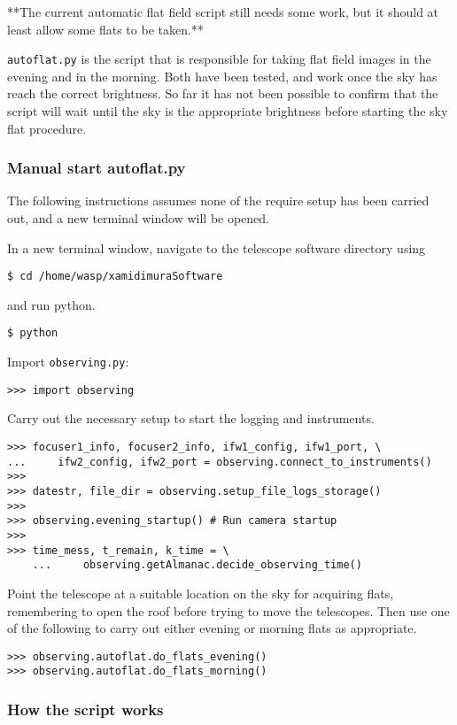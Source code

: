 \documentclass[a4paper,12pt]{article}
\newcommand{\observing}{\tt{observing.py}}
\begin{document}
{\color{blue} **The current automatic flat field script still needs some work, but it should at least allow some flats to be taken.**}

{\tt autoflat.py} is the script that is responsible for taking flat field images in the evening and in the morning. Both have been tested, and work once the sky has reach the correct brightness. So far it has not been possible to confirm that the script will wait until the sky is the appropriate brightness before starting the sky flat procedure.

\subsubsection{Manual start autoflat.py}

The following instructions assumes none of the require setup has been carried out, and a new terminal window will be opened.

In a new terminal window, navigate to the telescope software directory using
\begin{verbatim}
$ cd /home/wasp/xamidimuraSoftware
\end{verbatim}
and run python.
\begin{verbatim}
$ python
\end{verbatim}
Import {\observing}:
\begin{verbatim}
>>> import observing
\end{verbatim}

Carry out the necessary setup to start the logging and instruments.
\begin{verbatim}
>>> focuser1_info, focuser2_info, ifw1_config, ifw1_port, \
...		ifw2_config, ifw2_port = observing.connect_to_instruments()
>>>
>>> datestr, file_dir = observing.setup_file_logs_storage()
>>>
>>> observing.evening_startup() # Run camera startup
>>>
>>> time_mess, t_remain, k_time = \
	...		observing.getAlmanac.decide_observing_time()
\end{verbatim}

Point the telescope at a suitable location on the sky for acquiring flats, remembering to open the roof before trying to move the telescopes. Then use one of the following to carry out either evening or morning flats as appropriate.
\begin{verbatim}
>>> observing.autoflat.do_flats_evening()
>>> observing.autoflat.do_flats_morning()
\end{verbatim}

\subsubsection{How the script works}
\end{document}
